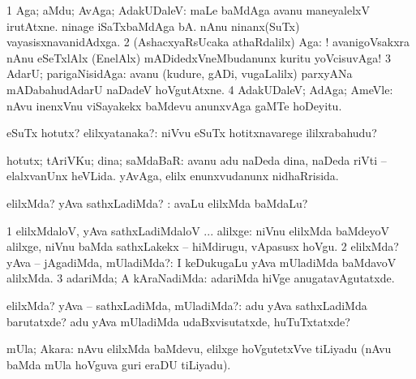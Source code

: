 \bentry
{} 
\gl{\saMavayx}
\expl{}
\bmng
\bnum
\num{1} Aga; aMdu; AvAga; AdakUDaleV:  maLe baMdAga avanu maneyalelxV irutAtxne.  ninage iSaTxbaMdAga bA.  nAnu ninanx(SuTx) vayasisxnavanidAdxga. 
\num{2} (AshacxyaRsUcaka athaRdalilx) Aga: ! avanigoVsakxra nAnu eSeTxlAlx (EnelAlx) mADidedxVneMbudanunx kuritu yoVcisuvAga! 
\num{3} AdarU; parigaNisidAga:  avanu (kudure, gADi, \mo vugaLalilx) parxyANa mADabahudAdarU naDadeV hoVgutAtxne. 
\num{4} AdakUDaleV; AdAga; AmeVle:  nAvu inenxVnu viSayakekx baMdevu anunxvAga gaMTe hoDeyitu. 
\enum
\emng
\eentry

\bentry
{} 
\gl{\nA}
\expl{}
\bmng
eSuTx hotutx? elilxyatanaka?:  niVvu eSuTx hotitxnavarege ililxrabahudu? 
\emng
\eentry

\bentry
{} 
\gl{\nA}
\expl{}
\bmng
hotutx; tAriVKu; dina; saMdaBaR:  avanu adu naDeda dina, naDeda riVti -- elalxvanUnx heVLida.  yAvAga, elilx enunxvudanunx nidhaRrisida. 
\emng
\eentry

\bentry
{} 
\gl{\kirxvi}
\expl{}
\bmng
elilxMda? yAva sathxLadiMda? :  avaLu elilxMda baMdaLu? 
\emng
\eentry

\bentry
{} 
\gl{\saMavayx}
\expl{}
\bmng
\bnum
\num{1} elilxMdaloV, yAva sathxLadiMdaloV ... alilxge:  niVnu elilxMda baMdeyoV alilxge, niVnu baMda sathxLakekx -- hiMdirugu, vApasusx hoVgu. 
\num{2} elilxMda? yAva -- jAgadiMda, mUladiMda?:  I keDukugaLu yAva mUladiMda baMdavoV alilxMda. 
\num{3} adariMda; A kAraNadiMda:  adariMda hiVge anugatavAgutatxde. 
\enum
\emng
\eentry

\bentry
{} 
\gl{\sanA}
\expl{}
\bmng
elilxMda? yAva -- sathxLadiMda, mUladiMda?:  adu yAva sathxLadiMda barutatxde?  adu yAva mUladiMda udaBxvisutatxde, huTuTxtatxde? 
\emng
\eentry

\bentry
{} 
\gl{\nA}
\expl{}
\bmng
mUla; Akara:  nAvu elilxMda baMdevu, elilxge hoVgutetxVve tiLiyadu (nAvu baMda mUla hoVguva guri eraDU tiLiyadu). 
\emng
\eentry

